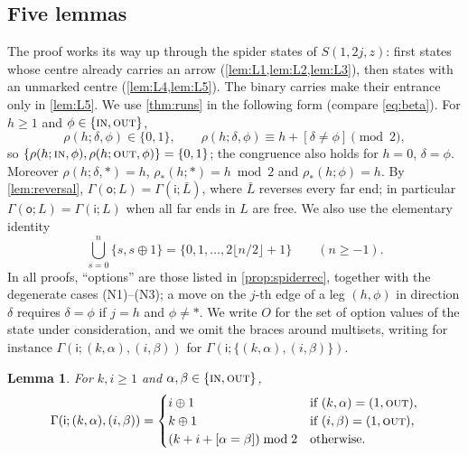 \documentclass[11pt]{amsart}
\newtheorem{lemma}[theorem]{Lemma}
\theoremstyle{definition}
\theoremstyle{remark}
\newcommand{\si}{\mathsf{i}}
\newcommand{\so}{\mathsf{o}}
\newcommand{\Sp}{S}
\newcommand{\free}{\ast}
\newcommand{\IN}{\textup{\textsc{in}}}
\newcommand{\OUT}{\textup{\textsc{out}}}
\begin{document}
\subsection{Five lemmas}
The proof works its way up through the spider states of $\Sp(1,2j,z)$: first states whose centre already carries an arrow (\cref{lem:L1,lem:L2,lem:L3}), then states with an unmarked centre (\cref{lem:L4,lem:L5}). The binary carries make their entrance only in \cref{lem:L5}. We use \cref{thm:runs} in the following form (compare \eqref{eq:beta}). For $h\ge1$ and $\phi\in\{\IN,\OUT\}$,
\begin{equation}\label{eq:R}
  \rho(h;\delta,\phi)\in\{0,1\},\qquad \rho(h;\delta,\phi)\equiv h+[\delta\ne\phi]\pmod 2,
\end{equation}
so $\{\rho(h;\IN,\phi),\rho(h;\OUT,\phi)\}=\{0,1\}$; the congruence also holds for $h=0$, $\delta=\phi$. Moreover $\rho(h;\delta,\free)=h$, $\rho_\free(h;\free)=h\bmod 2$ and $\rho_\free(h;\phi)=h$. By \cref{lem:reversal}, $\Gamma(\so;L)=\Gamma(\si;\bar L)$, where $\bar L$ reverses every far end; in particular $\Gamma(\so;L)=\Gamma(\si;L)$ when all far ends in $L$ are free. We also use the elementary identity
\begin{equation}\label{eq:pairs}
 \textstyle\bigcup_{s=0}^{n}\{s,s\oplus1\}=\{0,1,\dots,2\lfloor n/2\rfloor+1\}\qquad(n\ge-1).
\end{equation}
In all proofs, ``options'' are those listed in \cref{prop:spiderrec}, together with the degenerate cases (N1)--(N3); a move on the $j$-th edge of a leg $(h,\phi)$ in direction $\delta$ requires $\delta=\phi$ if $j=h$ and $\phi\neq\free$. We write $O$ for the set of option values of the state under consideration, and we omit the braces around multisets, writing for instance $\Gamma(\si;(k,\alpha),(i,\beta))$ for $\Gamma(\si;\{(k,\alpha),(i,\beta)\})$.

\begin{lemma}\label{lem:L1}
For $k,i\ge1$ and $\alpha,\beta\in\{\IN,\OUT\}$,
\[
\Gamma(\si;(k,\alpha),(i,\beta))=\begin{cases}
 i\oplus1 & \text{if } (k,\alpha)=(1,\OUT),\\
 k\oplus1 & \text{if } (i,\beta)=(1,\OUT),\\
 (k+i+[\alpha=\beta])\bmod 2 & \text{otherwise}.
\end{cases}
\]
\end{lemma}
\end{document}
